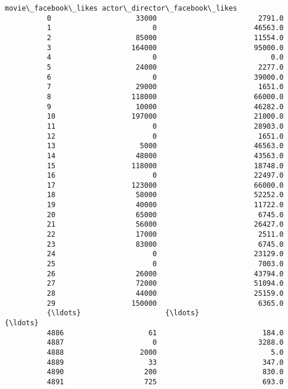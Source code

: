 \documentclass[11pt]{article}
\begin{document}
\begin{Verbatim}[commandchars=\\\{\}]
                movie\_facebook\_likes actor\_director\_facebook\_likes  
          0                    33000                        2791.0  
          1                        0                       46563.0  
          2                    85000                       11554.0  
          3                   164000                       95000.0  
          4                        0                           0.0  
          5                    24000                        2277.0  
          6                        0                       39000.0  
          7                    29000                        1651.0  
          8                   118000                       66000.0  
          9                    10000                       46282.0  
          10                  197000                       21000.0  
          11                       0                       28903.0  
          12                       0                        1651.0  
          13                    5000                       46563.0  
          14                   48000                       43563.0  
          15                  118000                       18748.0  
          16                       0                       22497.0  
          17                  123000                       66000.0  
          18                   58000                       52252.0  
          19                   40000                       11722.0  
          20                   65000                        6745.0  
          21                   56000                       26427.0  
          22                   17000                        2511.0  
          23                   83000                        6745.0  
          24                       0                       23129.0  
          25                       0                        7003.0  
          26                   26000                       43794.0  
          27                   72000                       51094.0  
          28                   44000                       25159.0  
          29                  150000                        6365.0  
          {\ldots}                    {\ldots}                           {\ldots}  
          4886                    61                         184.0  
          4887                     0                        3288.0  
          4888                  2000                           5.0  
          4889                    33                         347.0  
          4890                   200                         830.0  
          4891                   725                         693.0  

\end{Verbatim}
\end{document}
